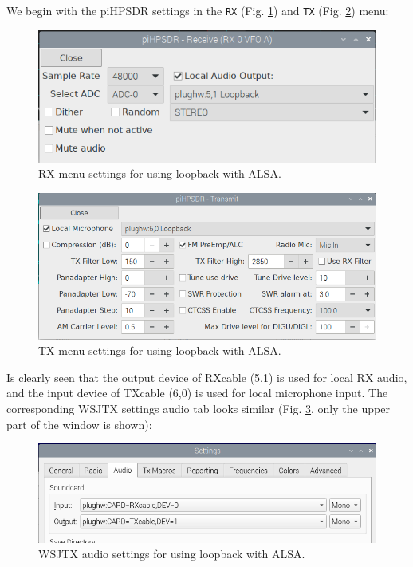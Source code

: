 \documentclass[12pt]{book}
\def\bltt#1{\texttt{\color{blue}#1}}
\def\pH{pi\-HPSDR }
\begin{document}
We begin with the \pH settings in the \bltt{RX} (Fig. \ref{fig:rx_settings_alsa_audio}) and
\bltt{TX} (Fig. \ref{fig:tx_settings_alsa_audio}) menu:

\begin{figure}[ht]
\center
\includegraphics[width=12cm]{rx_settings_alsa_audio.png}
\caption{RX menu settings for using loopback with ALSA.}
\label{fig:rx_settings_alsa_audio}
\end{figure}

\begin{figure}[ht]
\center
\includegraphics[width=12cm]{tx_settings_alsa_audio.png}
\caption{TX menu settings for using loopback with ALSA.}
\label{fig:tx_settings_alsa_audio}
\end{figure}

Is clearly seen that the output device of RXcable (5,1) is used for local RX audio, and the input
device of TXcable (6,0) is used for local microphone input. The corresponding WSJTX settings audio
tab looks similar (Fig. \ref{fig:wsjtx_settings_alsa_audio}, only the upper part of the
window is shown):

\begin{figure}[ht]
\center
\includegraphics[width=12cm]{wsjtx_settings_alsa_audio.png}
\caption{WSJTX audio settings for using loopback with ALSA.}
\label{fig:wsjtx_settings_alsa_audio}
\end{figure}
\end{document}
